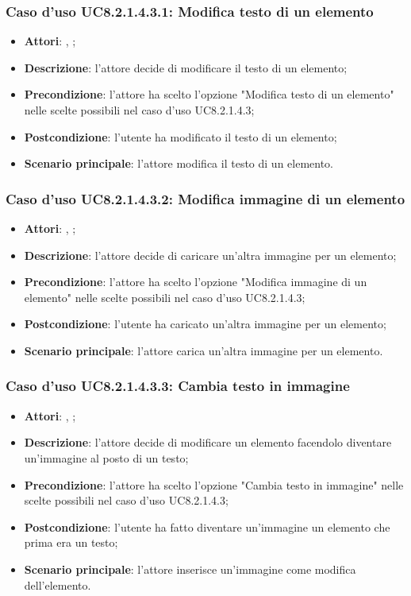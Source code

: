 		\subsubsection{Caso d'uso UC8.2.1.4.3.1: Modifica testo di un elemento}
		\label{UC8.2.1.4.3.1}
		\begin{itemize}
			\item \textbf{Attori}: \uau, \uaupro;
			\item \textbf{Descrizione}: l'attore decide di modificare il testo di un elemento;
			\item \textbf{Precondizione}: l'attore ha scelto l'opzione "Modifica testo di un elemento" nelle scelte possibili nel caso d'uso UC8.2.1.4.3;
			\item \textbf{Postcondizione}: l'utente ha modificato il testo di un elemento;
			\item \textbf{Scenario principale}: l'attore modifica il testo di un elemento.  
		\end{itemize}
		
		\subsubsection{Caso d'uso UC8.2.1.4.3.2: Modifica immagine di un elemento}
		\label{UC8.2.1.4.3.2}
		\begin{itemize}
			\item \textbf{Attori}: \uau, \uaupro;
			\item \textbf{Descrizione}: l'attore decide di caricare un'altra immagine per un elemento;
			\item \textbf{Precondizione}: l'attore ha scelto l'opzione "Modifica immagine di un elemento" nelle scelte possibili nel caso d'uso UC8.2.1.4.3;
			\item \textbf{Postcondizione}: l'utente ha caricato un'altra immagine per un elemento;
			\item \textbf{Scenario principale}: l'attore carica un'altra immagine per un elemento.
		\end{itemize}
		
		\subsubsection{Caso d'uso UC8.2.1.4.3.3: Cambia testo in immagine}
		\label{UC8.2.1.4.3.3}
		\begin{itemize}
			\item \textbf{Attori}: \uau, \uaupro;
			\item \textbf{Descrizione}: l'attore decide di modificare un elemento facendolo diventare un'immagine al posto di un testo;
			\item \textbf{Precondizione}: l'attore ha scelto l'opzione "Cambia testo in immagine" nelle scelte possibili nel caso d'uso UC8.2.1.4.3;
			\item \textbf{Postcondizione}: l'utente ha fatto diventare un'immagine un elemento che prima era un testo;
			\item \textbf{Scenario principale}: l'attore inserisce un'immagine come modifica dell'elemento.  
		\end{itemize}
		
